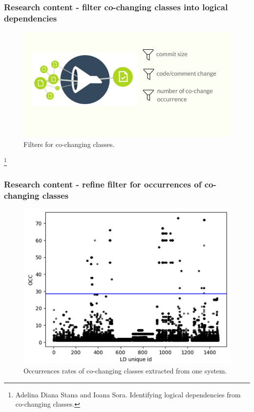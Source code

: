 \documentclass{beamer}
\begin{document}
 \begin{frame}
\frametitle{Research content - filter co-changing classes into logical dependencies}
\begin{center}
     \begin{figure}
	\includegraphics[width=\textwidth]{filter.jpg}
	\caption{\label{fig:fig3}Filters for co-changing classes.}
     \end{figure}
\end{center}
\footnote{Adelina Diana Stana and Ioana Sora. Identifying logical dependencies from co-changing classes. }

\end{frame}

 \begin{frame}
\frametitle{Research content - refine filter for occurrences of co-changing classes}

\begin{center}
     \begin{figure}
	\includegraphics[width= 9.0 cm]{filter_occ.PNG}
	\caption{\label{fig:fig4} Occurrences rates of co-changing classes extracted from one system. }
     \end{figure}
\end{center}

\end{frame}
\end{document}

